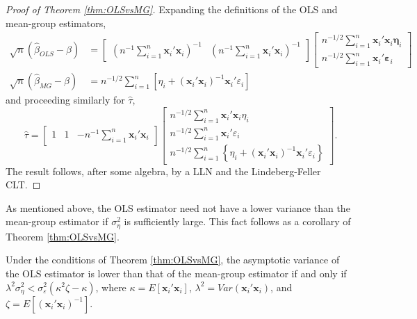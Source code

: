 \begin{proof}[Proof of Theorem \ref{thm:OLSvsMG}]
Expanding the definitions of the OLS and mean-group estimators, 
\begin{align*}
  \sqrt{n} (\widehat{\beta}_{OLS} - \beta) &=  \left[\begin{array}{cc}
    \left(n^{-1}\sum_{i=1}^{n} \mathbf{x}_i'  \mathbf{x}_i\right)^{-1} & \left(n^{-1}\sum_{i=1}^{n} \mathbf{x}_i'  \mathbf{x}_i\right)^{-1}\end{array} \right] 
  \left[\begin{array}{c} 
n^{-1/2}\sum_{i=1}^{n} \mathbf{x}_i'\mathbf{x}_i\mathbf{\eta}_i   \\
n^{-1/2}\sum_{i=1}^{n} \mathbf{x}_i'\mathbf{\varepsilon}_i   
\end{array}\right]\\
\sqrt{n} (\widehat{\beta}_{MG} - \beta)  &=  n^{-1/2} \sum_{i=1}^n \left[\eta_i + (\mathbf{x}_i'\mathbf{x}_i)^{-1} \mathbf{x}_i'\varepsilon_i\right]
\end{align*}
and proceeding similarly for $\widehat{\tau}$,
\[
\widehat{\tau}  =  
\left[
  \begin{array}{ccc}
  1 & 1& -n^{-1}\sum_{i=1}^n \mathbf{x}_i'\mathbf{x}_i
\end{array}\right] 
\left[\begin{array}{c}
n^{-1/2} \sum_{i=1}^n \mathbf{x}_i'\mathbf{x}_i \eta_i \\
n^{-1/2} \sum_{i=1}^n \mathbf{x}_i'\varepsilon_i\\
n^{-1/2} \sum_{i=1}^n \left\{ \eta_i + (\mathbf{x}_i'\mathbf{x}_i)^{-1} \mathbf{x}_i'\varepsilon_i\right\} 
\end{array}
\right].
\]
The result follows, after some algebra, by a LLN and the Lindeberg-Feller CLT.
\end{proof}


As mentioned above, the OLS estimator need not have a lower variance than the mean-group estimator if $\sigma_{\eta}^2$ is sufficiently large.
This fact follows as a corollary of Theorem \ref{thm:OLSvsMG}.

\begin{cor}
  Under the conditions of Theorem \ref{thm:OLSvsMG}, the asymptotic variance of the OLS estimator is lower than that of the mean-group estimator if and only if $\lambda^2\sigma_\eta^2 < \sigma_\varepsilon^2(\kappa^2\zeta - \kappa)$, 
where $\kappa = E[\mathbf{x}_i' \mathbf{x}_i]$, $\lambda^2 = Var\left( \mathbf{x}_i'\mathbf{x}_i \right)$, and $\zeta = E\left[ \left( \mathbf{x}_i' \mathbf{x}_i \right)^{-1} \right]$.  
\label{cor:MG}
\end{cor}


